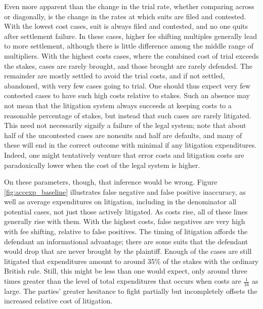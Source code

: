 \documentclass{article}
\begin{document}
Even more apparent than the change in the trial rate, whether comparing across or diagonally, is the change in the rates at which suits are filed and contested.  With the lowest cost cases, suit is always filed and contested, and no one quits after settlement failure. In these cases, higher fee shifting multiples generally lead to more settlement, although there is little difference among the middle range of multipliers. With the highest costs cases, where the combined cost of trial exceeds the stakes, cases are rarely brought, and those brought are rarely defended. The remainder are mostly settled to avoid the trial costs, and if not settled, abandoned, with very few cases going to trial. One should thus expect very few contested cases to have such high costs relative to stakes. Such an absence may not mean that the litigation system always succeeds at keeping costs to a reasonable percentage of stakes, but instead that such cases are rarely litigated. This need not necessarily signify a failure of the legal system; note that about half of the uncontested cases are nonsuits and half are defaults, and many of these will end in the correct outcome with minimal if any litigation expenditures. Indeed, one might tentatively venture that error costs and litigation costs are paradoxically lower when the cost of the legal system is higher. 

On these parameters, though, that inference would be wrong. Figure \ref{fig:accexp_baseline} illustrates false negative and false positive inaccuracy, as well as average expenditures on litigation, including in the denominator all potential cases, not just those actively litigated. As costs rise, all of these lines generally rise with them. With the highest costs, false negatives are very high with fee shifting, relative to false positives. The timing of litigation affords the defendant an informational advantage; there are some suits that the defendant would drop that are never brought by the plaintiff. Enough of the cases are still litigated  that expenditures amount to around 35\% of the stakes with the ordinary British rule. Still, this might be less than one would expect, only around three times greater than the level of total expenditures that occurs when costs are $\frac{1}{16}$ as large. The parties' greater hesitance to fight partially but incompletely offsets the increased relative cost of litigation.
\end{document}
